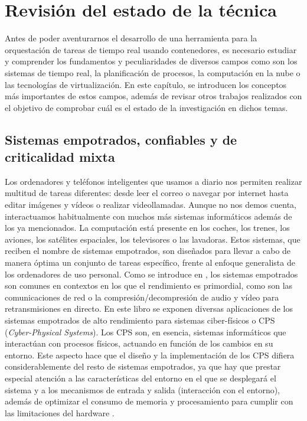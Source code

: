 \chapter{Revisión del estado de la técnica}

Antes de poder aventurarnos el desarrollo de una herramienta para la
orquestación de tareas de tiempo real usando contenedores, es necesario
estudiar y comprender los fundamentos y peculiaridades de diversos campos como
son los sistemas de tiempo real, la planificación de procesos, la computación en
la nube o las tecnologías de virtualización. En este capítulo, se introducen los
conceptos más importantes de estos campos, además de revisar otros trabajos
realizados con el objetivo de comprobar cuál es el estado de la investigación
en dichos temas.

\section{Sistemas empotrados, confiables y de criticalidad mixta}

Los ordenadores y teléfonos inteligentes que usamos a diario nos permiten
realizar multitud de tareas diferentes: desde leer el correo o navegar por
internet hasta editar imágenes y vídeos o realizar videollamadas. Aunque no nos
demos cuenta, interactuamos habitualmente con muchos más sistemas informáticos
además de los ya mencionados. La computación está presente en los coches, los
trenes, los aviones, los satélites espaciales, los televisores o las lavadoras.
Estos sistemas, que reciben el nombre de sistemas empotrados, son diseñados para
llevar a cabo de manera óptima un conjunto de tareas específico, frente al
enfoque generalista de los ordenadores de uso personal. Como se introduce en
\cite{wolf_high-performance_2014}, los sistemas empotrados son comunes en
contextos en los que el rendimiento es primordial, como son las comunicaciones
de red o la compresión/decompresión de audio y vídeo para retransmisiones en
directo. En este libro se exponen diversas aplicaciones de los sistemas
empotrados de alto rendimiento para sistemas ciber-físicos o CPS
(\textit{Cyber-Physical Systems}). Los CPS son, en esencia, sistemas
informáticos que interactúan con procesos físicos, actuando en función de los
cambios en su entorno. Este aspecto hace que el diseño y la implementación de
los CPS difiera considerablemente del resto de sistemas empotrados, ya que hay
que prestar especial atención a las características del entorno en el que se
desplegará el sistema y a los mecanismos de entrada y salida (interacción con el
entorno), además de optimizar el consumo de memoria y procesamiento para cumplir
con las limitaciones del hardware \cite{lee_introduction_2016}.

